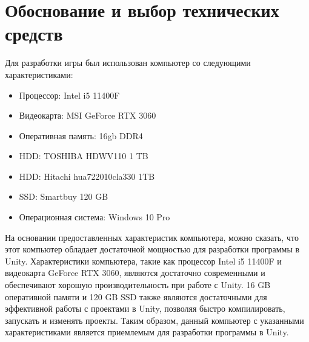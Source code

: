 \section{\label{sec:ch01/sec02}Обоснование и выбор технических средств}

Для разработки игры был использован компьютер со следующими характеристиками:
\begin{itemize}
    \item Процессор: Intel i5 11400F
    \item Видеокарта: MSI GeForce RTX 3060
    \item Оперативная память: 16gb DDR4
    \item HDD: TOSHIBA HDWV110 1 TB
    \item HDD: Hitachi hua722010cla330 1TB
    \item SSD: Smartbuy 120 GB
    \item Операционная система: Windows 10 Pro
    \end{itemize}

На основании предоставленных характеристик компьютера, можно сказать,
что этот компьютер обладает достаточной мощностью для разработки программы в Unity. Характеристики компьютера, такие как процессор Intel i5 11400F и видеокарта  GeForce RTX 3060, являются достаточно современными и обеспечивают хорошую производительность при работе с Unity. 16 GB оперативной памяти и 120 GB SSD также являются достаточными для эффективной работы с проектами в Unity, позволяя быстро компилировать, запускать и изменять проекты. Таким образом, данный компьютер с указанными характеристиками является приемлемым для разработки программы в Unity.